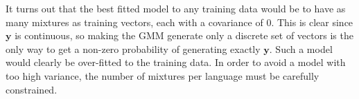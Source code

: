 It turns out that the best fitted model to any training data would be to have as many mixtures as training vectors, each with a covariance of 0. This is clear since $\mathbf{y}$ is continuous, so making the GMM generate only a discrete set of vectors is the only way to get a non-zero probability of generating exactly $\mathbf{y}$. Such a model would clearly be over-fitted to the training data. In order to avoid a model with too high variance, the number of mixtures per language must be carefully constrained.
